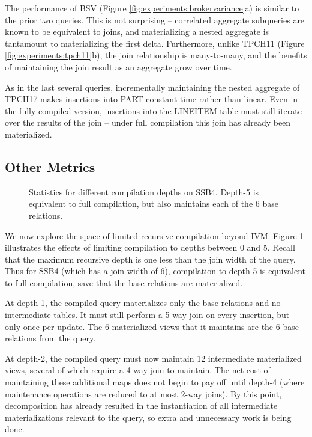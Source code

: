 The performance of BSV (Figure \ref{fig:experiments:brokervariance}a) is similar to the prior two queries.  This is not surprising -- correlated aggregate subqueries are known to be equivalent to joins, and materializing a nested aggregate is tantamount to materializing the first delta.  Furthermore, unlike TPCH11 (Figure \ref{fig:experiments:tpch11}b), the join relationship is many-to-many, and the benefits of maintaining the join result as an aggregate grow over time.

As in the last several queries, incrementally maintaining the nested aggregate of TPCH17 makes insertions into PART constant-time rather than linear.  Even in the fully compiled version, insertions into the LINEITEM table must still iterate over the results of the join -- under full compilation this join has already been materialized.

\subsection{Other Metrics}
\label{sec:experiments:othermetrics}

\begin{figure}
\begin{center}
\resizebox{3.4in}{!}{

}
\caption{Statistics for different compilation depths on SSB4.  Depth-5 is equivalent to full compilation, but also maintains each of the 6 base relations.}
\label{fig:experiments:ssb4depth}
\end{center}
\vspace*{-0.2in}
\end{figure}
We now explore the space of limited recursive compilation beyond IVM.  Figure \ref{fig:experiments:ssb4depth} illustrates the effects of limiting compilation to depths between 0 and 5.  Recall that the maximum recursive depth is one less than the join width of the query.  Thus for SSB4 (which has a join width of 6), compilation to depth-5 is equivalent to full compilation, save that the base relations are materialized.

At depth-1, the compiled query materializes only the base relations and no intermediate tables.  It must still perform a 5-way join on every insertion, but  only once per update.  The 6 materialized views that it maintains are the 6 base relations from the query.  

At depth-2, the compiled query must now maintain 12 intermediate materialized views, several of which require a 4-way join to maintain.  The net cost of maintaining these additional maps does not begin to pay off until depth-4 (where maintenance operations are reduced to at most 2-way joins).  By this point, decomposition has already resulted in the instantiation of all intermediate materializations relevant to the query, so extra and unnecessary work is being done.  

